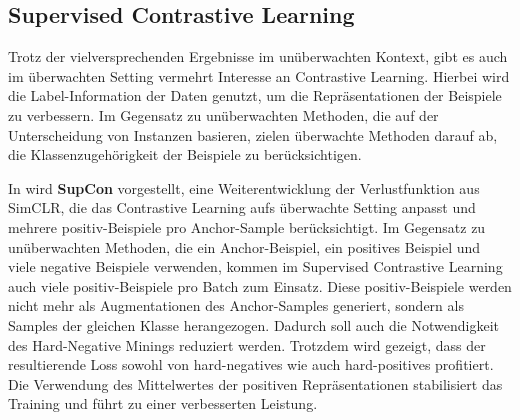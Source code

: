 \subsection{Supervised Contrastive Learning} \label{sec:sup-contrastive}

Trotz der vielversprechenden Ergebnisse im unüberwachten Kontext, gibt es auch im überwachten Setting vermehrt Interesse an Contrastive Learning. Hierbei wird die Label-Information der Daten genutzt, um die Repräsentationen der Beispiele zu verbessern. Im Gegensatz zu unüberwachten Methoden, die auf der Unterscheidung von Instanzen basieren, zielen überwachte Methoden darauf ab, die Klassenzugehörigkeit der Beispiele zu berücksichtigen.

In \parencite{Khosla2020supcon} wird \textbf{SupCon} vorgestellt, eine Weiterentwicklung der Verlustfunktion aus SimCLR, die das Contrastive Learning aufs überwachte Setting anpasst und mehrere positiv-Beispiele pro Anchor-Sample berücksichtigt. Im Gegensatz zu unüberwachten Methoden, die ein Anchor-Beispiel, ein positives Beispiel und viele negative Beispiele verwenden, kommen im Supervised Contrastive Learning auch viele positiv-Beispiele pro Batch zum Einsatz. Diese positiv-Beispiele werden nicht mehr als Augmentationen des Anchor-Samples generiert, sondern als Samples der gleichen Klasse herangezogen. Dadurch soll auch die Notwendigkeit des Hard-Negative Minings reduziert werden. Trotzdem wird gezeigt, dass der resultierende Loss sowohl von hard-negatives wie auch hard-positives profitiert. Die Verwendung des Mittelwertes der positiven Repräsentationen stabilisiert das Training und führt zu einer verbesserten Leistung.


